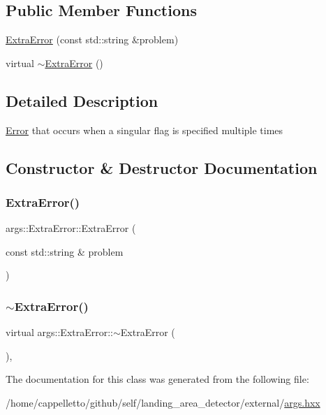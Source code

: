 \subsection*{Public Member Functions}
\begin{DoxyCompactItemize}
\item 
\hyperlink{classargs_1_1_extra_error_abfb5547b6d82444b6b7fb18d39424e97}{Extra\+Error} (const std\+::string \&problem)
\item 
virtual \hyperlink{classargs_1_1_extra_error_aeb16f55e10a446520d30ae35a1c3b174}{$\sim$\+Extra\+Error} ()
\end{DoxyCompactItemize}


\subsection{Detailed Description}
\hyperlink{classargs_1_1_error}{Error} that occurs when a singular flag is specified multiple times 

\subsection{Constructor \& Destructor Documentation}
\mbox{\label{classargs_1_1_extra_error_abfb5547b6d82444b6b7fb18d39424e97}} 
\subsubsection{\texorpdfstring{Extra\+Error()}{ExtraError()}}
{\footnotesize\ttfamily args\+::\+Extra\+Error\+::\+Extra\+Error (\begin{DoxyParamCaption}\item[{const std\+::string \&}]{problem }\end{DoxyParamCaption})\hspace{0.3cm}{\ttfamily [inline]}}

\mbox{\label{classargs_1_1_extra_error_aeb16f55e10a446520d30ae35a1c3b174}} 
\subsubsection{\texorpdfstring{$\sim$\+Extra\+Error()}{~ExtraError()}}
{\footnotesize\ttfamily virtual args\+::\+Extra\+Error\+::$\sim$\+Extra\+Error (\begin{DoxyParamCaption}{ }\end{DoxyParamCaption})\hspace{0.3cm}{\ttfamily [inline]}, {\ttfamily [virtual]}}



The documentation for this class was generated from the following file\+:\begin{DoxyCompactItemize}
\item 
/home/cappelletto/github/self/landing\+\_\+area\+\_\+detector/external/\hyperlink{args_8hxx}{args.\+hxx}\end{DoxyCompactItemize}
